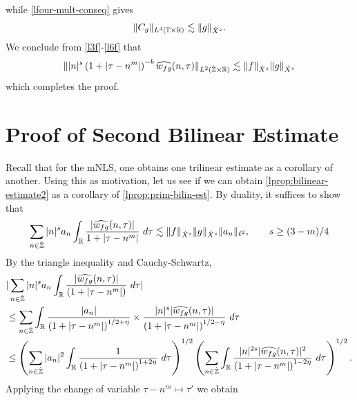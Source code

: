 %
while \eqref{lfour-mult-conseq} gives
%
%
\begin{equation}
	\label{l6f}
	\begin{split}
		\|C_g \|_{L^4(\mathbb{T} \times \mathbb{R})} \lesssim \|g\|_{\dot{X}^s}.
	\end{split}
\end{equation}
%
%
We conclude from \eqref{l3f}-\eqref{l6f} that
%
%
\begin{equation*}
	\begin{split}
		\| |n|^s \left( 1 + | \tau - n^{m } | \right)^{-b} \widehat{w_{fg}}(n, \tau) 
		 \|_{L^2(\dot{\mathbb{Z}} \times \mathbb{R})}
		 \lesssim \|f\|_{\dot{X}^s} \|g\|_{\dot{X}^s}
	\end{split}
\end{equation*}
%
%
which completes the proof.  \qquad \qedsymbol
%
%

\section{Proof of Second Bilinear Estimate}
Recall that for the mNLS, one obtains one trilinear estimate as a corollary of
another. Using this as motivation, let us see if we can obtain
\cref{lprop:bilinear-estimate2} as a corollary of
\cref{lprop:prim-bilin-est}. By
duality, it suffices to show that
%
\begin{equation}
	\label{lduality-est}
	\begin{split}
		\sum_{n \in \dot{\mathbb{Z}}}  |n|^{s}
		a_n \int_{\mathbb{R}} \frac{|\widehat{w_{fg}}(n, \tau)|}{1 
		+ | \tau - n^{m } |} \ d \tau \lesssim \|f\|_{\dot{X}^s} \|g\|_{\dot{X}^s}
		\|a_n \|_{\ell^2}, \qquad s \ge (3-m)/4 
	\end{split}
\end{equation}
%
By the triangle inequality 
and Cauchy-Schwartz,
%
\begin{equation}
	\label{l1m}
	\begin{split}
		& | \sum_{n \in \dot{\mathbb{Z}}} |n|^{s} a_n
		\int_{\mathbb{R}}\frac{| \widehat{w_{fg}}(n, \tau) |}{(1 + | \tau - n^{m } |)} \ d \tau |
		\\
		& \le \sum_{n \in \dot{\mathbb{Z}}} \int_{\mathbb{R}} \frac{| a_n |}{\left( 1 + 
		| \tau - n^{m } |
		\right)^{1/2 + \eta}} \times \frac{| n|^s  |
		\widehat{w_{fg}}(n, \tau) |}{\left( 
		1 + | \tau - n^{m } | \right)^{1/2 - \eta}} \ d \tau
		\\
		& \le \left( \sum_{n \in \dot{\mathbb{Z}}} | a_{n} |^2\int_{\mathbb{R}} \frac{1}{\left( 1 + |
		\tau - n^{m } | \right)^{1 + 2 \eta}} \ d \tau  
		\right)^{1/2} 
		\left ( \sum_{n \in \dot{\mathbb{Z}}}\int_{\mathbb{R}} \frac{|n|^{2s} | \widehat{w_{fg}}(n, \tau) 
		|^2}{\left( 1 + | \tau - n^{m } | \right)^{1 -2 \eta}}\ d \tau 
		\right)^{1/2}.
	\end{split}
\end{equation}
%
Applying the change of variable $\tau - n^{m }
\mapsto \tau'$ we obtain  

